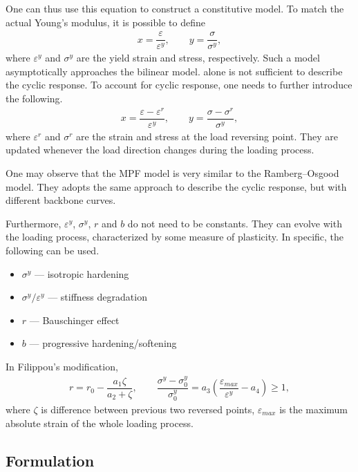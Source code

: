 One can thus use this equation to construct a constitutive model.
To match the actual Young's modulus, it is possible to define
\begin{gather}\label{eq:mpf_scaled}
	x=\dfrac{\varepsilon}{\varepsilon^y},\qquad
	y=\dfrac{\sigma}{\sigma^y},
\end{gather}
where $\varepsilon^y$ and $\sigma^y$ are the yield strain and stress, respectively.
Such a model asymptotically approaches the bilinear model.
 alone is not sufficient to describe the cyclic response.
To account for cyclic response, one needs to further introduce the following.
\begin{gather}
	x=\dfrac{\varepsilon-\varepsilon^r}{\varepsilon^y},\qquad
	y=\dfrac{\sigma-\sigma^r}{\sigma^y},
\end{gather}
where $\varepsilon^r$ and $\sigma^r$ are the strain and stress at the load reversing point.
They are updated whenever the load direction changes during the loading process.

One may observe that the MPF model is very similar to the Ramberg--Osgood model.
They adopts the same approach to describe the cyclic response, but with different backbone curves.

Furthermore, $\varepsilon^y$, $\sigma^y$, $r$ and $b$ do not need to be constants.
They can evolve with the loading process, characterized by some measure of plasticity.
In specific, the following can be used.
\begin{itemize}
	\item $\sigma^y$ --- isotropic hardening
	\item $\sigma^y/\varepsilon^y$ --- stiffness degradation
	\item $r$ --- Bauschinger effect
	\item $b$ --- progressive hardening/softening
\end{itemize}

In Filippou's modification,
\begin{gather}
	r=r_0-\dfrac{a_1\zeta}{a_2+\zeta},\qquad
	\dfrac{\sigma^y-\sigma^y_0}{\sigma^y_0}=a_3\left(\dfrac{\varepsilon_{max}}{\varepsilon^y}-a_4\right)\geqslant1,
\end{gather}
where $\zeta$ is difference between previous two reversed points, $\varepsilon_{max}$ is the maximum absolute strain of the whole loading process.
\subsection{Formulation}
